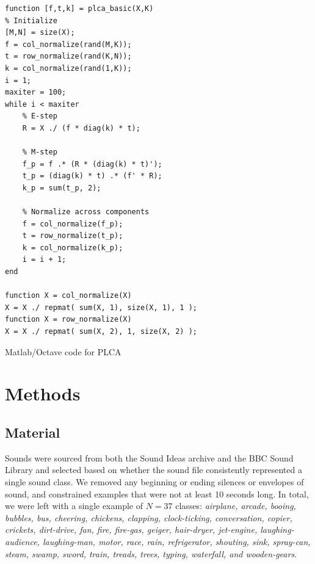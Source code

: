\documentclass[a4paper,10pt,final]{ThesisStyle}
\begin{document}
\begin{program}
  \begin{verbatim}
function [f,t,k] = plca_basic(X,K)
% Initialize
[M,N] = size(X);
f = col_normalize(rand(M,K));
t = row_normalize(rand(K,N));
k = col_normalize(rand(1,K));
i = 1;
maxiter = 100;
while i < maxiter
    % E-step
    R = X ./ (f * diag(k) * t);
    
    % M-step
    f_p = f .* (R * (diag(k) * t)');
    t_p = (diag(k) * t) .* (f' * R);
    k_p = sum(t_p, 2);
    
    % Normalize across components
    f = col_normalize(f_p);
    t = row_normalize(t_p);
    k = col_normalize(k_p);
    i = i + 1;
end

function X = col_normalize(X)
X = X ./ repmat( sum(X, 1), size(X, 1), 1 );
function X = row_normalize(X)
X = X ./ repmat( sum(X, 2), 1, size(X, 2) );
\end{verbatim}
  \caption{Matlab/Octave code for PLCA}
\end{program}




\section{Methods}

\subsection{Material}
Sounds were sourced from both the Sound Ideas archive and the BBC Sound Library and selected based on whether the sound file consistently represented a single sound class.  We removed any beginning or ending silences or envelopes of sound, and constrained examples that were not at least 10 seconds long.  In total, we were left with a single example of $N = 37$ classes: \textit{airplane, arcade, booing, bubbles, bus, cheering, chickens, clapping, clock-ticking, conversation, copier, crickets, dirt-drive, fan, fire, fire-gas, geiger, hair-dryer, jet-engine, laughing-audience, laughing-man, motor, race, rain, refrigerator, shouting, sink, spray-can, steam, swamp, sword, train, treads, trees, typing, waterfall, and wooden-gears}.  
\end{document}
